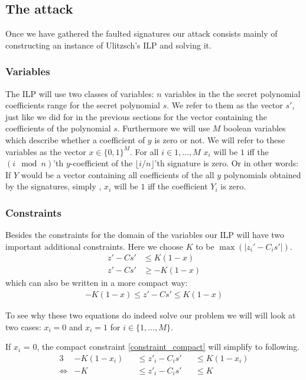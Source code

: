 \documentclass[a4paper,titlepage]{article}
\begin{document}
\subsection{The attack}
Once we have gathered the faulted signatures our attack consists mainly of constructing an instance of Ulitzsch's ILP and solving it. 

\subsubsection{Variables}
\label{sec:ilpvars}
The ILP will use two classes of variables: $n$ variables in the the secret polynomial coefficients range for the secret polynomial $s$. We refer to them as the vector $s'$, just like we did for in the previous sections for the vector containing the coefficients of the polynomial $s$.
Furthermore we will use $M$ boolean variables which describe whether a coefficient of $y$ is zero or not. We will refer to these variables as the vector $x \in \{0, 1\}^M$. For all $i \in {1, \ldots, M}$ $x_{i}$ will be $1$ iff the $(i \mod n)$'th $y$-coefficient of the $\lfloor i / n \rfloor$'th signature is zero. Or in other words: If $Y$ would be a vector containing all coefficients of the all $y$ polynomials obtained by the signatures, simply , $x_{i}$ will be $1$ iff the coefficient $Y_{i}$ is zero.

\subsubsection{Constraints}
Besides the constraints for the domain of the variables our ILP will have two important additional constraints. Here we choose $K$ to be $\max(\lvert z_{i}' - C_{i}s' \rvert)$.
\begin{align}
	\label{constraint_leq}
	z' - Cs' & \leq K (1 - x) \\
	\label{constraint_geq}
	z' - Cs'  & \geq - K (1 - x)
\end{align}
which can also be written in a more compact way:
\begin{align}
	\label{constraint_compact}
	 - K (1 - x) \leq z' - Cs'  \leq K (1 - x)
\end{align}

To see why these two equations do indeed solve our problem we will will look at two cases: $x_{i} = 0$ and $x_{i} = 1$ for $i \in \{1, \ldots, M\}$.

If $x_{i}$ = 0, the compact constraint \eqref{constraint_compact} will simplify to following.
\begin{alignat}{3}
	 &-K(1 - x_{i}) &&\leq z'_{i} - C_{i}s'  &&\leq K(1 - x_{i}) \\
	 \label{alwaystrue}
	 \Leftrightarrow&- K &&\leq z'_{i} - C_{i}s'  &&\leq K
\end{alignat}
\end{document}
